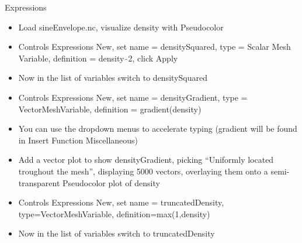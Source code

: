\begin{frame}{Expressions}
  \begin{beamerboxesrounded}[upper=block head,lower=block body,shadow=true]{}
    \begin{itemize}\setlength{\itemsep}{0mm}
    \item Load sineEnvelope.nc, visualize density with Pseudocolor
    \item Controls \ra Expressions \ra New, set name = densitySquared, type = Scalar Mesh Variable,
      definition = density$\hat{\,\,\,}$2, click Apply
    \item Now in the list of variables switch to densitySquared
    \end{itemize}
  \end{beamerboxesrounded}
  \pause
  \begin{beamerboxesrounded}[upper=block head,lower=block body,shadow=true]{}
    \begin{itemize}\setlength{\itemsep}{0mm}
    \item Controls \ra Expressions \ra New, set name = densityGradient, type = VectorMeshVariable,
      definition = gradient(density)
    \item You can use the dropdown menus to accelerate typing (gradient
      will be found in Insert Function \ra Miscellaneous)
    \item Add a vector plot to show densityGradient, picking ``Uniformly located troughout the mesh'',
      displaying 5000 vectors, overlaying them onto a semi-transparent Pseudocolor plot of density
    \end{itemize}
  \end{beamerboxesrounded}
  \pause
  \begin{beamerboxesrounded}[upper=block head,lower=block body,shadow=true]{}
    \begin{itemize}\setlength{\itemsep}{0mm}
    \item Controls \ra Expressions \ra New, set name = truncatedDensity, type=VectorMeshVariable,
      definition=max(1,density)
    \item Now in the list of variables switch to truncatedDensity
    \end{itemize}
  \end{beamerboxesrounded}
\end{frame}

